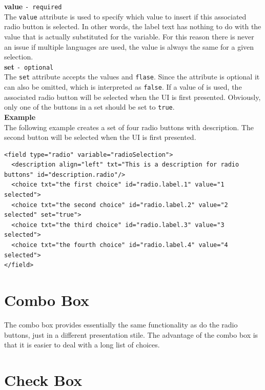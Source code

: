 \textbf{value} \texttt{- required}\\

The \texttt{value} attribute is used to specify which value to insert if
this associated radio button is selected. In other words, the label text
has nothing to do with the value that is actually substituted for the
variable. For this reason there is never an issue if multiple languages
are used, the value is always the same for a given selection.\\

\textbf{set} \texttt{- optional}\\

The \texttt{set} attribute accepts the values  and
\texttt{flase}. Since the attribute is optional it can also be omitted,
which is interpreted as \texttt{false}. If a value of  is
used, the associated radio button will be selected when the UI is first
presented. Obviously, only one of the buttons in a set should be set to
\texttt{true}.\\

\textbf{Example}\\

The following example creates a set of four radio buttons with
description. The second button will be selected when the UI is first
presented.\\

\footnotesize
\begin{verbatim}
<field type="radio" variable="radioSelection">
  <description align="left" txt="This is a description for radio buttons" id="description.radio"/>
  <choice txt="the first choice" id="radio.label.1" value="1 selected">
  <choice txt="the second choice" id="radio.label.2" value="2 selected" set="true">
  <choice txt="the third choice" id="radio.label.3" value="3 selected">
  <choice txt="the fourth choice" id="radio.label.4" value="4 selected">
</field>
\end{verbatim}
\normalsize

\section{Combo Box}

The combo box provides essentially the same functionality as do the
radio buttons, just in a different presentation stile. The advantage of
the combo box is that it is easier to deal with a long list of
choices.\\

\section{Check Box}

